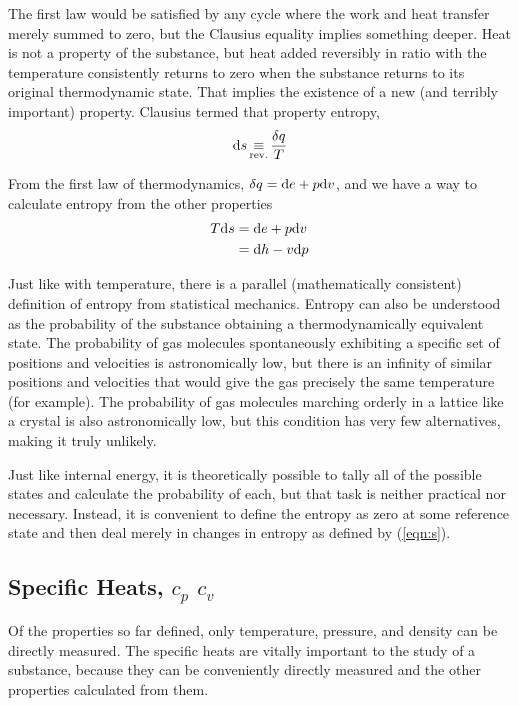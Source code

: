 The first law would be satisfied by any cycle where the work and heat transfer merely summed to zero, but the Clausius equality implies something deeper.  Heat is not a property of the substance, but heat added reversibly in ratio with the temperature consistently returns to zero when the substance returns to its original thermodynamic state.  That implies the existence of a new (and terribly important) property.  Clausius termed that property entropy,
\begin{align}
\mathrm{d} s \operatorname*{\equiv}_\mathrm{rev.} \frac{\delta q}{T}\label{eqn:s}
\end{align}

From the first law of thermodynamics, $\delta q = \mathrm{d} e + p \mathrm{d} v$, and we have a way to calculate entropy from the other properties
\begin{align}
T \mathrm{d} s &= \mathrm{d} e + p\mathrm{d} v\\
 &= \mathrm{d} h - v \mathrm{d} p
\end{align}

Just like with temperature, there is a parallel (mathematically consistent) definition of entropy from statistical mechanics.  Entropy can also be understood as the probability of the substance obtaining a thermodynamically equivalent state.  The probability of gas molecules spontaneously exhibiting a specific set of positions and velocities is astronomically low, but there is an infinity of similar positions and velocities that would give the gas precisely the same temperature (for example).  The probability of gas molecules marching orderly in a lattice like a crystal is also astronomically low, but this condition has very few alternatives, making it truly unlikely.

Just like internal energy, it is theoretically possible to tally all of the possible states and calculate the probability of each, but that task is neither practical nor necessary.  Instead, it is convenient to define the entropy as zero at some reference state and then deal merely in changes in entropy as defined by (\ref{eqn:s}).

\subsection{Specific Heats, $c_p$ $c_v$}\label{sec:intro:c}

Of the properties so far defined, only temperature, pressure, and density can be directly measured.  The specific heats are vitally important to the study of a substance, because they can be conveniently directly measured and the other properties calculated from them.

